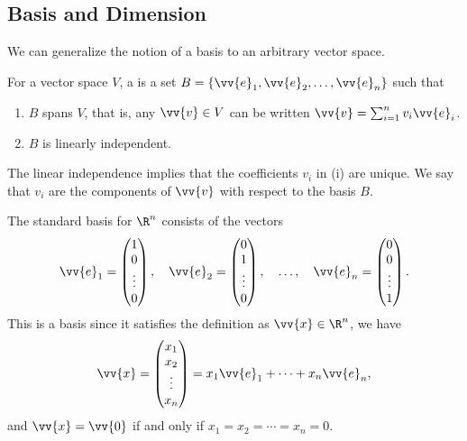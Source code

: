 \subsection{Basis and Dimension}

We can generalize the notion of a basis to an arbitrary vector space.

\begin{definition}[Basis]
    For a vector space $V$, a  is a set $B = \{\vv{e}_1, \vv{e}_2, \dots, \vv{e}_n \}$ such that
    \begin{enumerate}[label=(\roman*)]
        \item $B$ spans $V$, that is, any $\vv{v} \in V$ can be written $\vv{v} = \sum_{i = 1}^n v_i \vv{e}_i$.
        \item $B$ is linearly independent.
    \end{enumerate}
\end{definition}

The linear independence implies that the coefficients $v_i$ in (i) are unique. We say that $v_i$ are the components of $\vv{v}$ with respect to the basis $B$.

\begin{example}
    The standard basis for $\R^n$ consists of the vectors
    $$
\vv{e}_1 = \begin{pmatrix}1 \\ 0\\ \vdots \\ 0\end{pmatrix}, \quad \vv{e}_2 = \begin{pmatrix}0 \\ 1\\ \vdots \\ 0\end{pmatrix}, \quad \dots, \quad \vv{e}_n = \begin{pmatrix}0 \\ 0\\ \vdots \\ 1\end{pmatrix}.
    $$
    This is a basis since it satisfies the definition as $\vv{x} \in \R^n$, we have
    $$
\vv{x} = \begin{pmatrix}x_1 \\ x_2\\ \vdots \\ x_n\end{pmatrix} = x_1 \vv{e}_1 + \cdots + x_n \vv{e}_n,
    $$
    and $\vv{x} = \vv{0}$ if and only if $x_1 = x_2 = \cdots = x_n = 0$. 
\end{example}

